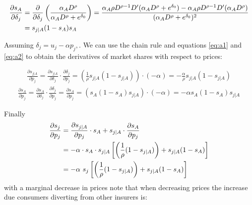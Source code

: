 \documentclass[12pt]{article}
\theoremstyle{plain}
\theoremstyle{plain}
\begin{document}
\begin{align}\label{eq:a2}
\frac{\partial s_A}{\partial \delta_j} &=
\frac{\partial}{\partial \delta_j}\left(\frac{\alpha_A D^\rho}{\alpha_A D^\rho + e^{\delta_0}}  \right) 
= \frac{\alpha_A \rho D^{\rho-1} D' (\alpha_A D^\rho + e^{\delta_0})-\alpha_A \rho D^{\rho-1} D' (\alpha_A D^\rho)}{(\alpha_A D^\rho + e^{\delta_0})^2} \notag \\ 
&= s_{j\mid A}  (1-s_A)s_A 
\end{align}


Assuming $\delta_j = u_j - \alpha p_j, $. We can use the chain rule and equations \ref{eq:a1} and \ref{eq:a2} to obtain the derivatives of market shares with respect to prices: 

\begin{align}\label{eq:a3}
     \frac{\partial s_{j|A}}{\partial p_j} = \frac{\partial s_{j|A}}{\partial \delta_j} \cdot \frac{\partial \delta_j}{\partial p_j} = \left(\frac{1}{\rho}s_{j|A}(1-s_{j|A})\right) \cdot (-\alpha) = -\frac{\alpha}{\rho}s_{j|A}(1-s_{j|A})
\end{align}
\begin{align}\label{eq:a4}
    \frac{\partial s_A}{\partial p_j} = \frac{\partial s_A}{\partial \delta_j} \cdot \frac{\partial \delta_j}{\partial p_j} = \frac{\partial s_A}{\partial p_j} = (s_A(1-s_A)s_{j|A}) \cdot (-\alpha) = -\alpha s_A(1-s_A)s_{j|A}    
\end{align}

Finally 
\begin{align}\label{eq:a5}
    \frac{\partial s_j}{\partial p_j} &= \frac{\partial s_{j|A}}{\partial p_j} \cdot s_A + s_{j|A} \cdot \frac{\partial s_A}{\partial p_j} \notag \\
    &= -\alpha \cdot s_A \cdot s_{j|A}\left[ \left(\frac{1}{\rho}(1-s_{j|A})\right)  + s_{j|A}  (1-s_A) \right] \notag \\
    &= -\alpha \ s_j \left[ \left(\frac{1}{\rho}(1-s_{j|A})\right)  + s_{j|A}  (1-s_A) \right]  
\end{align}
with a marginal decrease in prices 
note that when decreasing prices the increase due consumers diverting from other insurers is: 
\end{document}
